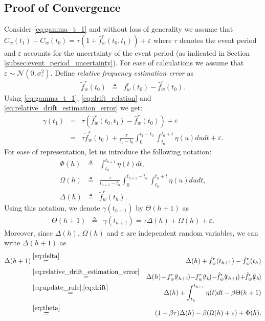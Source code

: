 \subsection{Proof of Convergence}
Consider \eqref{eq:gamma_t_1} and without loss of 
generality we assume that 
$C_{w}(t_{1})-C_{w}(t_{0})=\tau(1+\bar{f}_{w}^{r}(t_0,t_1))+\varepsilon$
where $\tau$ denotes the event period and $\varepsilon$ accounts for the 
uncertainty of the event period (as 
indicated in Section \ref{subsec:event_period_uncertainty}). For ease of 
calculations we assume that $\varepsilon\sim\mathcal{N}(0,\sigma^2_{\tau})$. 
Define \emph{relative frequency estimation error} as
\begin{eqnarray}
\tilde{f}_{w}^{r}(t_0) & \triangleq & 
f_{w}^{r}(t_0)-\hat{f}_{w}^{r}(t_0).\label{eq:relative_drift_estimation_error}
\end{eqnarray}
Using \eqref{eq:gamma_t_1}, \eqref{eq:drift_relation} and 
\eqref{eq:relative_drift_estimation_error} we get:
\begin{eqnarray}
\gamma(t_1) & = & 
\tau(\bar{f}_{w}^{r}(t_0,t_1)-\hat{f}_{w}^{r}(t_0))+ \varepsilon \nonumber \\
&=&  
\tau\tilde{f}_{w}^{r}(t_0)+\frac{\tau}{t_1-t_0}\int_{0}^{t_1-t_0}\!\!\!\int_{t_{0}}^{t_0+t}\!\!\!\!\!\!\!\!\!\!\!\eta(u)dudt
+ \varepsilon.
\end{eqnarray}
For ease of representation, let us introduce the following 
notation:
\begin{eqnarray}
\Phi(h) &\triangleq& \int_{t_h}^{t_{h+1}}\eta(t)dt, \\
\Omega(h) &\triangleq& 
\frac{\tau}{t_{h+1}-t_h}\int_{0}^{t_{h+1}-t_h}\int_{t_{h}}^{t_h+t}\eta(u)dudt,
\\
\Delta(h) &\triangleq& \tilde{f}_{w}^{r}(t_{h}). \label{eq:delta}
\end{eqnarray}
Using this notation, we denote $\gamma(t_{h+1})$ by $\Theta(h+1)$ as
\begin{eqnarray}
\Theta(h+1) &\triangleq& \gamma(t_{h+1})=\tau\Delta(h) + \Omega(h)+\varepsilon. 
\label{eq:theta}
\end{eqnarray}
Moreover, since $\Delta(h)$, $\Omega(h)$ and $\varepsilon$ are 
independent random variables, we can write $\Delta(h+1)$ as
\begin{eqnarray}
\Delta(h+1) &\overset{\eqref{eq:delta}}{=}& 
\Delta(h)+\tilde{f}_{w}^{r}(t_{h+1})-\tilde{f}_{w}^{r}(t_{h}) \nonumber \\
&\overset{\eqref{eq:relative_drift_estimation_error}}{=}& \Delta(h)
\!+\!f_w^r(\!t_{h+1}\!)\!-\!\!f_w^r(\!t_{h}\!) \!-\!\!\hat{f}_w^r(\!t_{h+1}\!)\!+\!\!\hat{f}_w^r(\!t_{h}\!)
\nonumber\\
&\overset{\eqref{eq:update_rule},\eqref{eq:drift}}{=}& 
\Delta(h)+\int_{t_h}^{t_{h+1}}\eta(t)dt-\beta\Theta(h+1) \nonumber \\
&\overset{\eqref{eq:theta}}{=}& 
(1-\beta\tau)\Delta(h)-\beta(\Omega(h)+\varepsilon) +\Phi(h). 
\label{eq:delta_recursive}
\end{eqnarray} 
